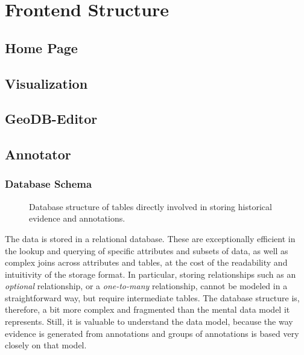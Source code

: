 \chapter{Frontend Structure}

\section{Home Page}


\section{Visualization}


\section{GeoDB-Editor}


\section{Annotator}
\label{sec:annotator}


\subsection{Database Schema}
\label{sec:database-schema}

\begin{figure}[htb]
  \caption{Database structure of tables directly involved in storing historical evidence and annotations.}
  \label{fig:annotator-schema}
\end{figure}

The data is stored in a relational database.
These are exceptionally efficient in the lookup and querying of specific attributes and subsets of data, as well as complex joins across attributes and tables, at the cost of the readability and intuitivity of the storage format.
In particular, storing relationships such as an \emph{optional} relationship, or a \emph{one-to-many} relationship, cannot be modeled in a straightforward way, but require intermediate tables.
The database structure is, therefore, a bit more complex and fragmented than the mental data model it represents.
Still, it is valuable to understand the data model, because the way evidence is generated from annotations and groups of annotations is based very closely on that model.


